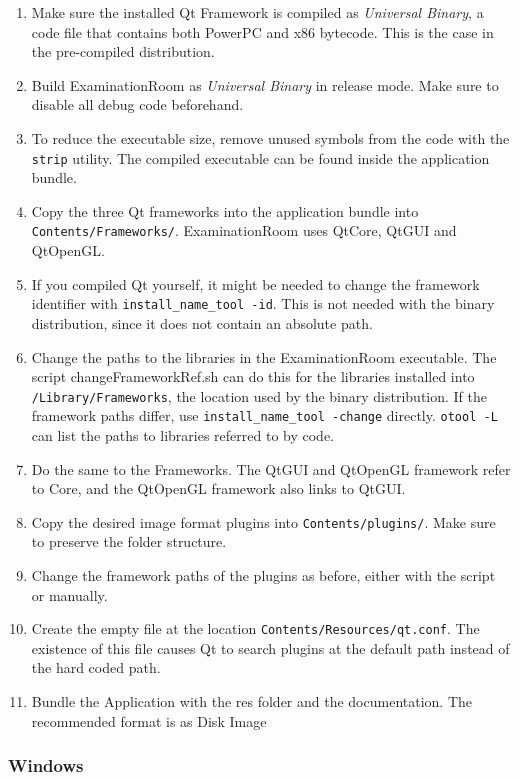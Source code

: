 \begin{enumerate}
\item Make sure the installed Qt Framework is compiled as \textit{Universal Binary}, a code file that contains both PowerPC and x86 bytecode. This is the case in the pre-compiled distribution.
\item Build ExaminationRoom as \textit{Universal Binary} in release mode.
Make sure to disable all debug code beforehand.
\item To reduce the executable size, remove unused symbols from the code with the \texttt{strip} utility.
The compiled executable can be found inside the application bundle.
\item Copy the three Qt frameworks into the application bundle into \texttt{Contents/Frameworks/}.
ExaminationRoom uses QtCore, QtGUI and QtOpenGL.
\item If you compiled Qt yourself, it might be needed to change the framework identifier with \texttt{install\_name\_tool -id}.
This is not needed with the binary distribution, since it does not contain an absolute path.
\item Change the paths to the libraries in the ExaminationRoom executable.
The script changeFrameworkRef.sh can do this for the libraries installed into \texttt{/Library/Frameworks}, the location used by the binary distribution.
If the framework paths differ, use \texttt{install\_name\_tool -change} directly.
\texttt{otool -L} can list the paths to libraries referred to by code.
\item Do the same to the Frameworks.
The QtGUI and QtOpenGL framework refer to Core, and the QtOpenGL framework also links to QtGUI.
\item Copy the desired image format plugins into \texttt{Contents/plugins/}.
Make sure to preserve the folder structure.
\item Change the framework paths of the plugins as before, either with the script or manually.
\item Create the empty file at the location \texttt{Contents/Resources/qt.conf}.
The existence of this file causes Qt to search plugins at the default path instead of the hard coded path.
\item Bundle the Application with the res folder and the documentation. The recommended format is as Disk Image
\end{enumerate}

\subsubsection*{Windows}
